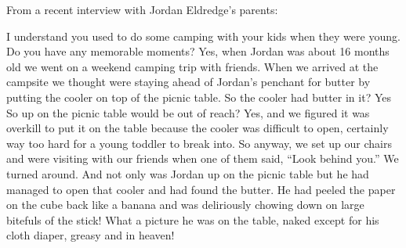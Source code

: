 
From a recent interview with Jordan Eldredge's parents:
\begin{dialogue}
 I understand you used to do some camping with
your kids when they were young. Do you have any memorable moments?
 Yes, when Jordan was about 16 months old we went on a weekend
camping trip with friends. When we arrived at the campsite we thought were
staying ahead of Jordan’s penchant for butter by putting the cooler on top of
the picnic table. 
 So the cooler had butter in it?
 Yes
 So up on the picnic table would be out of reach?
 Yes, and we figured it was overkill to put it on the table because
the cooler was difficult to open, certainly way too hard for a young toddler to
break into.
 So anyway, we set up our chairs and were visiting with our
friends when one of them said, ``Look behind you.''
 We turned around. And not only was Jordan up on the picnic table
but he had managed to open that cooler and had found the butter. 
 He had peeled the paper on the cube back like a banana and was
deliriously chowing down on large bitefuls of the stick!
 What a picture he was on the table, naked except for his cloth
diaper, greasy and in heaven!
\end{dialogue}

\begin{window}
\smallskip
\end{window}

